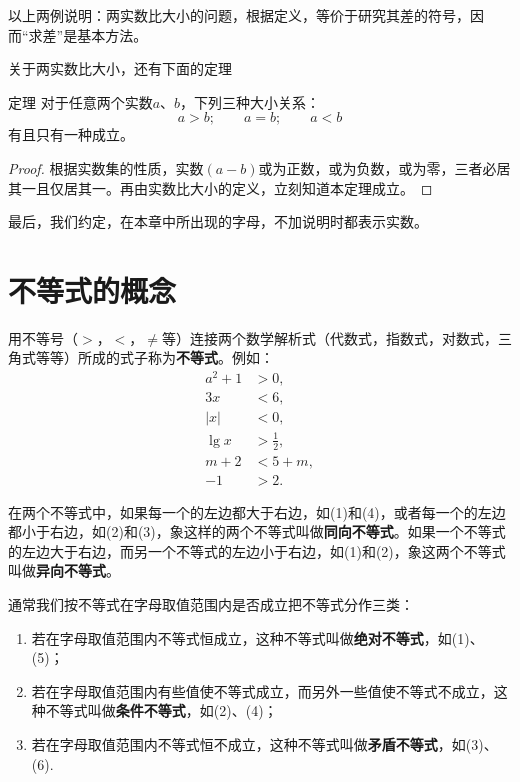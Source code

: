 \begin{note}
以上两例说明：两实数比大小的问题，根据定义，等价于研究其差的符号，因而“求差”是基本方法。
\end{note}

关于两实数比大小，还有下面的定理

\begin{thm}{定理}
    对于任意两个实数$a$、$b$，下列三种大小关系：
\[a>b;\qquad a=b;\qquad a<b\]
有且只有一种成立。
\end{thm}

\begin{proof}
    根据实数集的性质，实数$(a-b)$或为正数，或为负数，或为零，三者必居其一且仅居其一。再由实数比大小的定义，立刻知道本定理成立。
\end{proof} 

最后，我们约定，在本章中所出现的字母，不加说明时都表示实数。

\section{不等式的概念}
用不等号（$>$，$<$，$\ne$等）连接两个数学解析式（代数式，指数式，对数式，三角式等等）所成的式子称为\textbf{不等式}。例如：
\begin{align}
a^2+1&>0,\tag{1}\\
3x&<6,\tag{2}\\
|x|&<0,\tag{3}\\
\lg x&>\frac{1}{2},\tag{4}\\
m+2&<5+m,\tag{5}\\
-1&>2.\tag{6}    
\end{align}

在两个不等式中，如果每一个的左边都大于右边，如(1)和(4)，或者每一个的左边都小于右边，如(2)和(3)，象这样的两个不等式叫做\textbf{同向不等式}。如果一个不等式的左边大于右边，而另一个不等式的左边小于右边，如(1)和(2)，象这两个不等式叫做\textbf{异向不等式}。

通常我们按不等式在字母取值范围内是否成立把不等式分作三类：
\begin{enumerate}
    \item 若在字母取值范围内不等式恒成立，这种不等式叫做\textbf{绝对不等式}，如(1)、(5)；
    \item 若在字母取值范围内有些值使不等式成立，而另外一些值使不等式不成立，这种不等式叫做\textbf{条件不等式}，如(2)、(4)；
\item 若在字母取值范围内不等式恒不成立，这种不等式叫做\textbf{矛盾不等式}，如(3)、(6).
\end{enumerate}

